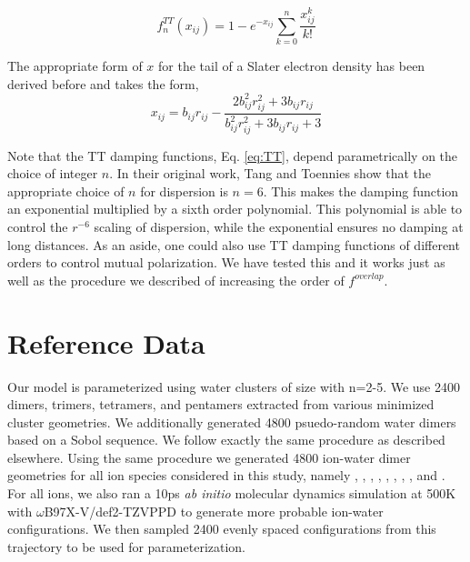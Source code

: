\documentclass[journal=jacsat,manuscript=article]{achemso}
\begin{document}
\begin{equation}
  f_n^{TT}(x_{ij}) = 1-e^{-x_{ij}}\sum_{k=0}^n\frac{x_{ij}^k}{k!}
  \label{eq:TT}
\end{equation}

The appropriate form of $x$ for the tail of a Slater electron density has been derived before\cite{van2016beyond} and takes the form,
\begin{equation}
  x_{ij}=b_{ij}r_{ij}-\frac{2b_{ij}^2r_{ij}^2+3b_{ij}r_{ij}}{b_{ij}^2r_{ij}^2+3b_{ij}r_{ij}+3}
  \label{eq:TT_x}
\end{equation}

Note that the TT damping functions, Eq. \ref{eq:TT}, depend parametrically on the choice of integer $n$. In their original work, Tang and Toennies show that the appropriate choice of $n$ for dispersion is $n=6$. This makes the damping function an exponential multiplied by a sixth order polynomial. This polynomial is able to control the $r^{-6}$ scaling of dispersion, while the exponential ensures no damping at long distances. As an aside, one could also use TT damping functions of different orders to control mutual polarization. We have tested this and it works just as well as the procedure we described of increasing the order of $f^{overlap}$.

\section*{Reference Data}
Our model is parameterized using water clusters of size  with n=2-5. We use 2400 dimers, trimers, tetramers, and pentamers extracted from various minimized cluster geometries. We additionally generated 4800 psuedo-random water dimers based on a Sobol sequence. We follow exactly the same procedure as described elsewhere.\cite{misquitta2008first} Using the same procedure we generated 4800 ion-water dimer geometries for all ion species considered in this study, namely , , , , , , , , and . For all ions, we also ran a 10ps \textit{ab initio} molecular dynamics simulation at 500K with $\omega$B97X-V/def2-TZVPPD to generate more probable ion-water configurations. We then sampled 2400 evenly spaced configurations from this trajectory to be used for parameterization.
\end{document}
